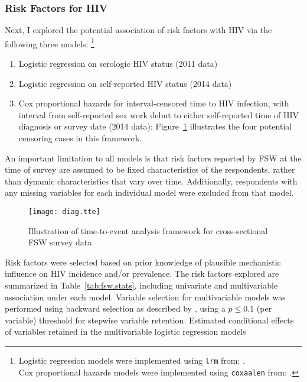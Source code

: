 \subsubsection{Risk Factors for HIV}\label{model.par.fsw.fac}
Next, I explored the potential association of risk factors with HIV
via the following three models:%
\footnote{Logistic regression models were implemented using \texttt{lrm} from:
  .\\
Cox proportional hazards models were implemented using \texttt{coxaalen} from:
  .}
\begin{enumerate}
  \item Logistic regression on serologic HIV status (2011 data)
  \item Logistic regression on self-reported HIV status (2014 data)
  \item Cox proportional hazards for interval-censored time to HIV infection,
    with interval from self-reported sex work debut 
    to either self-reported time of HIV diagnosis or survey date (2014 data);
    Figure~\ref{fig:fsw.tte.interval} illustrates
    the four potential censoring cases in this framework.
\end{enumerate}
An important limitation to all models is that
risk factors reported by FSW at the time of survey
are assumed to be fixed characteristics of the respondents,
rather than dynamic characteristics that vary over time.
Additionally, respondents with any missing variables for each individual model
were excluded from that model. %
\begin{figure}
  \centering
  \texttt{[image: diag.tte]}
  \caption{Illustration of time-to-event analysis framework
    for cross-sectional FSW survey data}
  \label{fig:fsw.tte.interval}
\end{figure}
\par
Risk factors were selected based on
prior knowledge of plausible mechanistic influence on HIV incidence and/or prevalence.
The risk factors explored are summarized in Table~\ref{tab:fsw.stats},
including univariate and multivariable association under each model.
Variable selection for multivariable models
was performed using backward selection as described by \citet{Lawless1978},
using a $p \le 0.1$ (per variable) threshold for stepwise variable retention.
Estimated conditional effects of
variables retained in the multivariable logistic regression models
